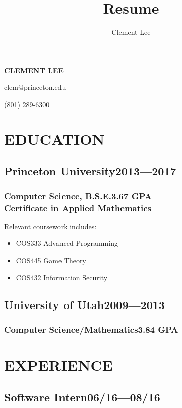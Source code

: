 \documentclass[11pt]{article}
\author{Clement Lee}
\title{Resume}
\begin{document}
\vspace*{1.5em}

{\huge\textbf{CLEMENT LEE}}
\vspace{0.25\baselineskip}

clem@princeton.edu

(801) 289-6300

\vspace{\baselineskip}
\begin{multicols}{2}
  \section*{EDUCATION}
  \subsection*{Princeton University\hfill\textnormal{2013---2017}}
  \subsubsection*{Computer Science, B.S.E.\hfill\textnormal{3.67 GPA}\\
    Certificate in Applied Mathematics}

  Relevant coursework includes:
  \begin{itemize}[noitemsep,nolistsep,leftmargin=*]
    \item COS333 Advanced Programming
    \item COS445 Game Theory
    \item COS432 Information Security
  \end{itemize}

  \subsection*{University of Utah\hfill\textnormal{2009---2013}}
  \subsubsection*{Computer Science/Mathematics\hfill\textnormal{3.84 GPA}}
  \vspace{\baselineskip}

  \section*{EXPERIENCE}
  \subsection*{Software Intern\hfill\textnormal{06/16---08/16}}

\end{multicols}
\end{document}
